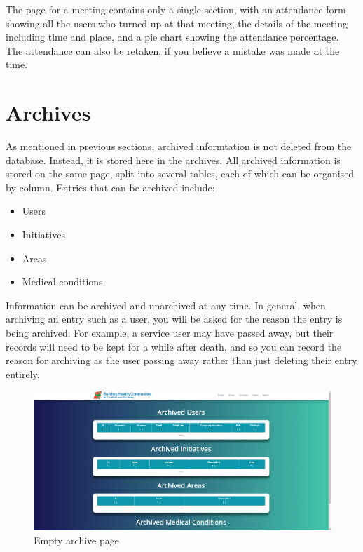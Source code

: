 \documentclass{bhcguides}
\begin{document}
The page for a meeting contains only a single section, with an attendance form showing all the users who turned up at that meeting, the details of the meeting including time and place, and a pie chart showing the attendance percentage. The attendance can also be retaken, if you believe a mistake was made at the time.

\pagebreak

\section{Archives}
\label{sec:archives}

As mentioned in previous sections, archived informtation is not deleted from the database. Instead, it is stored here in the archives. All archived information is stored on the same page, split into several tables, each of which can be organised by column. Entries that can be archived include:

\begin{itemize}
	\item Users
	\item Initiatives
	\item Areas
	\item Medical conditions
\end{itemize}

Information can be archived and unarchived at any time. In general, when archiving an entry such as a user, you will be asked for the reason the entry is being archived. For example, a service user may have passed away, but their records will need to be kept for a while after death, and so you can record the reason for archiving as the user passing away rather than just deleting their entry entirely.

\begin{figure}[h]
 \centerline{\includegraphics[width=\textwidth, height=\textheight, keepaspectratio]{archivepage.png}}
 \caption{Empty archive page}
 \label{fig:archivePage}
\end{figure}
\end{document}
